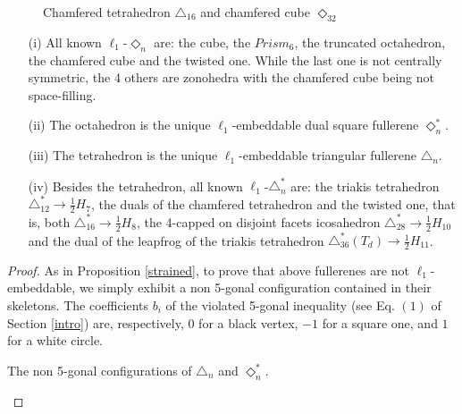 \begin{figure}[hbt]
\begin{center}
\caption{Chamfered tetrahedron $\triangle_{16}$ and chamfered cube $\Diamond_{32
}$}\label{eberh}
\end{center}
\end{figure}

\begin{proposition}
\noindent
\begin{itemize}
\item[(i)]
All known $\ell_1$-$\Diamond_n$ are: the cube, the $Prism_6$,
the truncated octahedron, the chamfered cube and the twisted one.
While the last one is not centrally symmetric, the 4 others are
zonohedra with the chamfered cube being not space-filling.
\item[(ii)]
The octahedron is the unique $\ell_1$-embeddable dual square fullerene $\Diamond^*_n$.
\item[(iii)]
The tetrahedron is the unique $\ell_1$-embeddable triangular fullerene $\triangle_n$.
\item[(iv)]
Besides the tetrahedron, all known $\ell_1$-$\triangle^*_n$ are: 
the triakis tetrahedron $\triangle_{12}^*\rightarrow\frac{1}{2}H_{7}$,
the duals of the chamfered tetrahedron and the twisted one, that is, both 
$\triangle_{16}^*\to\frac{1}{2}H_{8}$,
the 4-capped on disjoint facets icosahedron
$\triangle_{28}^*\rightarrow\frac{1}{2}H_{10}$ and
the dual of the leapfrog of the triakis tetrahedron 
$\triangle_{36}^*(T_d)\rightarrow\frac{1}{2}H_{11}$. 
\end{itemize}
\begin{proof}
As in Proposition \ref{strained},
to prove that above fullerenes are not $\ell_1$-embeddable, we simply exhibit a non 5-gonal
configuration contained in their skeletons. The coefficients $b_i$ of the violated
5-gonal inequality (see Eq. $(1)$ of Section \ref{intro})
are, respectively, $0$ for a black vertex, $-1$ for a square one, and $1$ for a white circle.

\begin{center}

The non 5-gonal configurations of $\triangle_n$ and $\Diamond^*_n$.
\end{center}

\end{proof}
\end{proposition}

